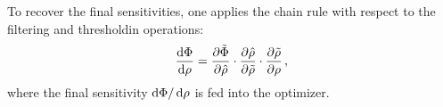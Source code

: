     To recover the final sensitivities, one applies the chain rule with respect to the filtering and thresholdin operations:
    \begin{equation}
        \frac{\mathop{}\!\text{d} \Phi}{\mathop{}\!\text{d} \rho} = \frac{\partial \tilde{\Phi}}{\partial \hat{\rho}} \cdot \frac{\partial \hat{\rho}}{\partial \tilde{\rho}} \cdot \frac{\partial \tilde{\rho}}{\partial \rho}\,,
    \end{equation}
    where the final sensitivity $\mathop{}\!\text{d} \Phi/\mathop{}\!\text{d} \rho$ is fed into the optimizer.










